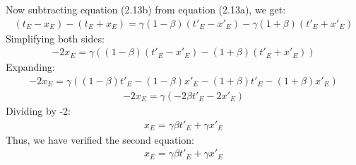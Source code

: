 \documentclass[12pt]{memoir}
\begin{document}
Now subtracting equation (2.13b) from equation (2.13a), we get:
\begin{align}
(t_E - x_E) - (t_E + x_E) = \gamma (1 - \beta)(t'_E - x'_E) - \gamma (1 + \beta)(t'_E + x'_E)
\end{align}
Simplifying both sides:
\begin{align}
-2x_E = \gamma \left( (1 - \beta)(t'_E - x'_E) - (1 + \beta)(t'_E + x'_E) \right)
\end{align}
Expanding:
\begin{align}
-2x_E = \gamma \left( (1 - \beta)t'_E - (1 - \beta)x'_E - (1 + \beta)t'_E - (1 + \beta)x'_E \right)
\end{align}
\begin{align}
-2x_E = \gamma \left( -2\beta t'_E - 2x'_E \right)
\end{align}
Dividing by -2:
\begin{align}
x_E = \gamma \beta t'_E + \gamma x'_E
\end{align}
Thus, we have verified the second equation:
\begin{align}
x_E = \gamma \beta t'_E + \gamma x'_E
\end{align}
\end{document}
